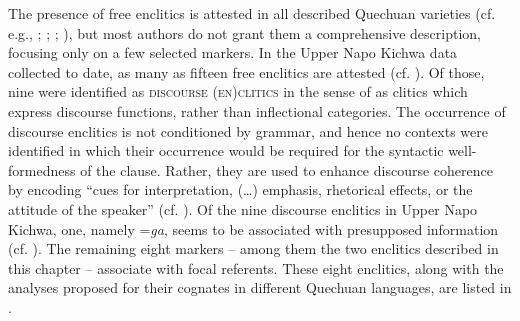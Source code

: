 \documentclass[output=paper]{langscibook}
\begin{document}
The presence of free enclitics is attested in all described Quechuan varieties (cf. e.g., \citealt{Parker1969}; \citealt{Cole1982}; \citealt{Weber1986}; \citealt{Cusihuaman1976}), but most authors do not grant them a comprehensive description, focusing only on a few selected markers. In the Upper Napo Kichwa data collected to date, as many as fifteen free enclitics are attested (cf. \citealt[ch.3]{Grzech2016a}). Of those, nine were identified as \textsc{discourse (en)clitics} in the sense of \cite[37]{Spencer2012} as clitics which express discourse functions, rather than inflectional categories. The occurrence of discourse enclitics is not conditioned by grammar, and hence no contexts were identified in which their occurrence would be required for the syntactic well-formedness of the clause. Rather, they are used to enhance discourse coherence by encoding “cues for interpretation, (…) emphasis, rhetorical effects, or the attitude of the speaker” (cf. \citealt[35]{Spencer2012}). Of the nine discourse enclitics in Upper Napo Kichwa, one, namely =\textit{ga}, seems to be associated with presupposed information (cf. \citealt[ch.4]{Grzech2016a}). The remaining eight markers – among them the two enclitics described in this chapter – associate with focal referents. These eight enclitics, along with the analyses proposed for their cognates in different Quechuan languages, are listed in .
\end{document}
